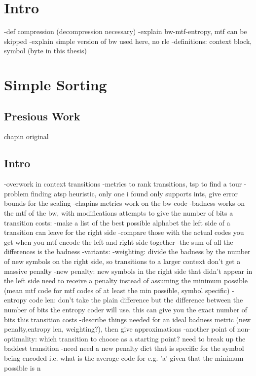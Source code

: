 \documentclass[a4paper]{scrreprt}
\begin{document}
\chapter{Intro}

-def compression (decompression necessary)
-explain bw-mtf-entropy, mtf can be skipped
-explain simple version of bw used here, no rle
-definitions: context block, symbol (byte in this thesis)

\chapter{Simple Sorting}

\section{Presious Work}

chapin original \cite{chapin1998sort,chapin2001diss}

\section{Intro}

-overwork in context transitions
-metrics to rank transitions, tsp to find a tour
-problem finding atsp heuristic, only one i found only supports ints, give 
	error bounds for the scaling
-chapins metrics work on the bw code
-badness works on the mtf of the bw, with modifications attempts to give the
	number of bits a transition costs:
	-make a list of the best possible alphabet the left side of a transition
		can leave for the right side
	-compare those with the actual codes you get when you mtf encode the left
		and right side together
	-the sum of all the differences is the badness
	-variants:
		-weighting: divide the badness by the number of new symbols on the right
			side, so transitions to a larger context don't get a massive
			penalty
		-new penalty: new symbols in the right side that didn't appear in the
			left side need to receive a penalty instead of assuming the minimum
			possible (mean mtf code for mtf codes of at least the min possible,
			symbol specific)
		-entropy code len: don't take the plain difference but the difference
			between the number of bits the entropy coder will use. this can
			give you the exact number of bits this transition costs 
	-describe things needed for an ideal badness metric (new penalty,entropy
		len, weighting?), then give approximations
	-another point of non-optimality: which transition to choose as a starting
		point? need to break up the baddest transition
	-need need a new penalty dict that is specific for the symbol being encoded
		i.e. what is the average code for e.g. 'a' given that the minimum
		possible is n
\end{document}
